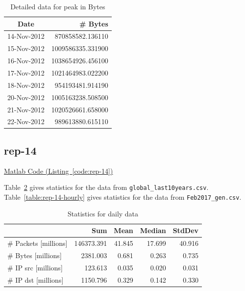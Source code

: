 \documentclass{article}
\newcommand{\codelink}[1]{%
    \hyperref[#1]{\faArrowCircleRight\enskip Matlab Code (Listing~\ref{#1})}%
}
\begin{document}
\begin{table}[h]
    \centering
    \begin{tabular}{c|r}
        Date & \# Bytes \\
        \hline
        14-Nov-2012& 870858582.136110 \\ 
        15-Nov-2012& 1009586335.331900 \\
        16-Nov-2012& 1038654926.456100 \\
        17-Nov-2012& 1021464983.022200 \\
        18-Nov-2012& 954193481.914190 \\ 
        20-Nov-2012& 1005163238.508500 \\
        21-Nov-2012& 1020526661.658000 \\
        22-Nov-2012& 989613880.615110  \\
    \end{tabular}
    \caption{\label{table:rep-13-optional} Detailed data for peak in Bytes}
\end{table}

\subsection{rep-14}
\codelink{code:rep-14}

Table~\ref{table:rep-14-daily} gives statistics for the data from
\texttt{global\_last10years.csv}. Table~\ref{table:rep-14-hourly} gives
statistics for the data from \texttt{Feb2017\_gen.csv}.

\begin{table}[h]
    \centering
    \begin{tabular}{l|rrrr}
                & Sum & Mean & Median & StdDev \\
                \hline
        \# Packets [millions] &   146373.391 & 41.845 & 17.699 & 40.916 \\
        \# Bytes [millions]   &    2381.003 & 0.681 & 0.263 & 0.735 \\
        \# IP src [millions]     & 123.613 & 0.035 & 0.020 & 0.031 \\
        \# IP dst  [millions]    & 1150.796 & 0.329 & 0.142 & 0.330 \\
    \end{tabular}
    \caption{\label{table:rep-14-daily} Statistics for daily data}
\end{table}
\end{document}
